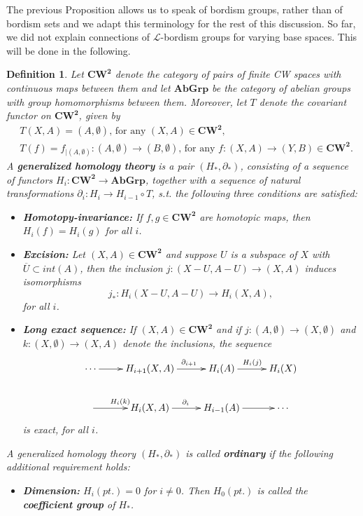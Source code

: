 \documentclass[11pt]{book}
\newtheorem{definition}{Definition}
\begin{document}
The previous Proposition allows us to speak of bordism groups, rather than of bordism sets and we adapt this terminology for the rest of this discussion. \newline So far, we did not explain connections of $\mathcal{L}$-bordism groups for varying base spaces. This will be done in the following.

\begin{definition}
Let $\boldsymbol{CW^2}$ denote the category of pairs of finite CW spaces with continuous maps between them and let $\boldsymbol{AbGrp}$ be the category of abelian groups with group homomorphisms between them. Moreover, let $T$ denote the covariant functor on $\boldsymbol{CW^2}$, given by
\begin{align*}
&T(X,A) = (A, \emptyset) \text{, for any } (X,A) \in \boldsymbol{CW^2},  \\
&T(f) = f_{|(A, \emptyset)} : (A, \emptyset) \to (B, \emptyset) \text{, for any } f: (X,A) \to (Y,B) \in \boldsymbol{CW^2}.
\end{align*}
A \textbf{generalized homology theory} is a pair $(H_*, \partial_*)$, consisting of a sequence of functors $H_i : \boldsymbol{CW^2} \to \boldsymbol{AbGrp}$, together with a sequence of natural transformations $\partial_i : H_i \to H_{i-1} \circ T$, s.t. the following three conditions are satisfied: \begin{itemize}
\item[1.] \textbf{Homotopy-invariance:} If $f,g \in \boldsymbol{CW^2}$ are homotopic maps, then $H_i(f)=H_i(g)$ for all $i$.
\item[2.] \textbf{Excision:} Let $(X,A) \in \boldsymbol{CW^2}$ and suppose $U$ is a subspace of $X$ with $\overline{U} \subset int(A)$, then the inclusion $j: (X-U,A-U) \to (X,A)$ induces isomorphisms 
\begin{equation*}
j_* : H_i(X-U,A-U) \to H_i(X,A),
\end{equation*}
for all $i$.
\item[3.] \textbf{Long exact sequence:} If $(X,A) \in \boldsymbol{CW^2}$ and if $j: (A, \emptyset) \to (X, \emptyset)$ and $k: (X, \emptyset) \to (X,A)$ denote the inclusions, the sequence
\begin{equation*}
\begin{xy}
\xymatrix{ 
\cdots \ar[r]^{}     &   H_{i+1}(X,A) \ar[r]^{\ \ \partial_{i+1}}    &   H_i(A) \ar[r]^{H_i(j)}   &  H_i(X) \\
  \ar[r]^{H_i(k)}   &   H_i(X,A)  \ar[r]^{\partial_i}   &   H_{i-1}(A) \ar[r]^{}   &   \cdots
}
\end{xy}
\end{equation*}
is exact, for all $i$.
\end{itemize}
A generalized homology theory $(H_*, \partial_*)$ is called \textbf{ordinary} if the following additional requirement holds:
\begin{itemize}
\item[4.] \textbf{Dimension:} $H_i(pt.)=0$ for $i \neq 0$. Then $H_0(pt.)$ is called the \textbf{coefficient group} of $H_*$.
\end{itemize}
\end{definition}
\end{document}
